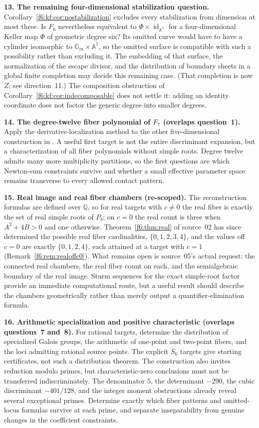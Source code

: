 \documentclass[11pt,a4paper]{article}
\theoremstyle{definition}
\newcommand{\A}{\mathbb A}
\newcommand{\Q}{\mathbb Q}
\newcommand{\Gm}{\mathbb G_m}
\newcommand{\id}{\operatorname{id}}
\begin{document}
\textbf{13. The remaining four-dimensional stabilization question.}
Corollary~\ref{f6:kf:cor:nostabilization} excludes every stabilization from
dimension at most three. Is $F_6$ nevertheless equivalent to
$\Phi\times\id_{\A^1}$ for a four-dimensional Keller map $\Phi$ of geometric
degree six? Its omitted curve would have to have a cylinder isomorphic to
$\Gm\times\A^1$, so the omitted surface is compatible with such a possibility
rather than excluding it. The embedding of that surface, the normalization of
the escape divisor, and the distribution of boundary sheets in a global
finite completion may decide this remaining case. (That completion is now
$Z$; see direction~11.) The composition obstruction of
Corollary~\ref{f6:kf:cor:indecomposable} does not settle it: adding an
identity coordinate does not factor the generic degree into smaller degrees.

\textbf{14. The degree-twelve fiber polynomial of $F_7$ (overlaps
question~1).} Apply the derivative-localization method to the other
five-dimensional construction in \cite{Gao}. A useful first target is not the
entire discriminant expansion, but a characterization of all fiber
polynomials without simple roots. Degree twelve admits many more multiplicity
partitions, so the first questions are which Newton-sum constraints survive
and whether a small effective parameter space remains transverse to every
allowed contact pattern.

\textbf{15. Real image and real fiber chambers (re-scoped).} The
reconstruction formulas are defined over $\Q$, so for real targets with
$c\ne0$ the real fiber is exactly the set of real simple roots of $P_b$; on
$c=0$ the real count is three when $A^2+4B>0$ and one otherwise.
Theorem~\ref{f6:thm:real} of source~02 has since determined the possible real
fiber cardinalities, $\{0,1,2,3,4\}$, and the values off $c=0$ are exactly
$\{0,1,2,4\}$, each attained at a target with $c=1$
(Remark~\ref{f6:rem:realoffc0}). What remains open is source~05's actual
request: the connected real chambers, the real fiber count on each, and the
semialgebraic boundary of the real image. Sturm sequences for the exact simple-root factor provide an immediate
computational route, but a useful result should describe the chambers
geometrically rather than merely output a quantifier-elimination formula.

\textbf{16. Arithmetic specialization and positive characteristic (overlaps
questions~7 and~8).} For rational targets, determine the distribution of
specialized Galois groups, the arithmetic of one-point and two-point fibers,
and the loci admitting rational source points. The explicit $S_6$ targets
give starting certificates, not such a distribution theorem. The
construction also invites reduction modulo primes, but characteristic-zero
conclusions must not be transferred indiscriminately. The denominator $5$,
the determinant $-290$, the cubic discriminant $-401/128$, and the integer
moment obstructions already reveal several exceptional primes. Determine
exactly which fiber patterns and omitted-locus formulas survive at each
prime, and separate inseparability from genuine changes in the coefficient
constraints.
\end{document}
